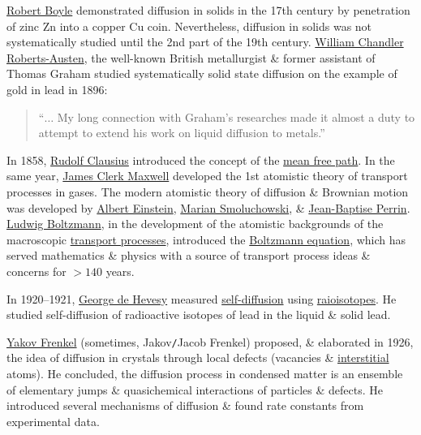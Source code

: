 \documentclass{article}
\begin{document}
\href{https://en.wikipedia.org/wiki/Robert_Boyle}{\sc Robert Boyle} demonstrated diffusion in solids in the 17th century by penetration of zinc Zn into a copper Cu coin. Nevertheless, diffusion in solids was not systematically studied until the 2nd part of the 19th century. \href{https://en.wikipedia.org/wiki/William_Chandler_Roberts-Austen}{\sc William Chandler Roberts-Austen}, the well-known British metallurgist \& former assistant of {\sc Thomas Graham} studied systematically solid state diffusion on the example of gold in lead in 1896:
\begin{quote}
	``$\ldots$ My long connection with Graham's researches made it almost a duty to attempt to extend his work on liquid diffusion to metals.''
\end{quote}
In 1858, \href{https://en.wikipedia.org/wiki/Rudolf_Clausius}{Rudolf Clausius} introduced the concept of the \href{https://en.wikipedia.org/wiki/Mean_free_path}{mean free path}. In the same year, \href{https://en.wikipedia.org/wiki/James_Clerk_Maxwell}{\sc James Clerk Maxwell} developed the 1st atomistic theory of transport processes in gases. The modern atomistic theory of diffusion \& Brownian motion was developed by \href{https://en.wikipedia.org/wiki/Albert_Einstein}{\sc Albert Einstein}, \href{https://en.wikipedia.org/wiki/Marian_Smoluchowski}{Marian Smoluchowski}, \& \href{https://en.wikipedia.org/wiki/Jean-Baptiste_Perrin}{Jean-Baptise Perrin}. \href{https://en.wikipedia.org/wiki/Ludwig_Boltzmann}{\sc Ludwig Boltzmann}, in the development of the atomistic backgrounds of the macroscopic \href{https://en.wikipedia.org/wiki/Transport_phenomena}{transport processes}, introduced the \href{https://en.wikipedia.org/wiki/Boltzmann_equation}{Boltzmann equation}, which has served mathematics \& physics with a source of transport process ideas \& concerns for $> 140$ years.

In 1920--1921, \href{https://en.wikipedia.org/wiki/George_de_Hevesy}{\sc George de Hevesy} measured \href{https://en.wikipedia.org/wiki/Self-diffusion}{self-diffusion} using \href{https://en.wikipedia.org/wiki/Radioisotope}{raioisotopes}. He studied self-diffusion of radioactive isotopes of lead in the liquid \& solid lead.

\href{https://en.wikipedia.org/wiki/Yakov_Frenkel}{\sc Yakov Frenkel} (sometimes, Jakov{\tt/}Jacob Frenkel) proposed, \& elaborated in 1926, the idea of diffusion in crystals through local defects (vacancies \& \href{https://en.wikipedia.org/wiki/Interstitial_defect}{interstitial} atoms). He concluded, the diffusion process in condensed matter is an ensemble of elementary jumps \& quasichemical interactions of particles \& defects. He introduced several mechanisms of diffusion \& found rate constants from experimental data.
\end{document}
